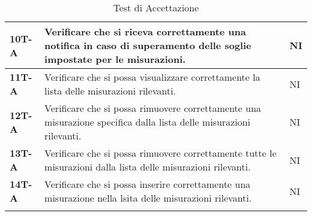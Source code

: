 \begin{longtable}{|>{\raggedright\arraybackslash}m{}|>{\raggedright\arraybackslash}m{}|>{\raggedright\arraybackslash}m{}|}
	\hline
	\textbf{10T-A}   & Verificare che si riceva correttamente una notifica in caso di superamento delle soglie impostate per le misurazioni. & NI\\
	\hline
	\textbf{11T-A}   & Verificare che si possa visualizzare correttamente la lista delle misurazioni rilevanti. & NI\\
	\hline
	\textbf{12T-A}   & Verificare che si possa rimuovere correttamente una misurazione specifica dalla lista delle misurazioni rilevanti. & NI\\
	\hline
	\textbf{13T-A}   & Verificare che si possa rimuovere correttamente tutte le misurazioni dalla lista delle misurazioni rilevanti. & NI\\
	\hline
	\textbf{14T-A}   & Verificare che si possa inserire correttamente una misurazione nella lsita delle misurazioni rilevanti. & NI\\
	\caption{Test di Accettazione} %
	\label{table:16}
\end{longtable}
